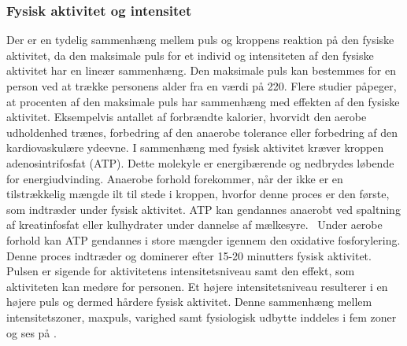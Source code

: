 \subsubsection{Fysisk aktivitet og intensitet}\label{subsub:ak_int}
Der er en tydelig sammenhæng mellem puls og kroppens reaktion på den fysiske aktivitet, da den maksimale puls for et individ og intensiteten af den fysiske aktivitet har en lineær sammenhæng. Den maksimale puls kan bestemmes for en person ved at trække personens alder fra en værdi på 220. \citep{CooperBlair2005}\newline
Flere studier påpeger, at procenten af den maksimale puls har sammenhæng med effekten af den fysiske aktivitet. Eksempelvis antallet af forbrændte kalorier, hvorvidt den aerobe udholdenhed trænes, forbedring af den anaerobe tolerance eller forbedring af den kardiovaskulære ydeevne. I sammenhæng med fysisk aktivitet kræver kroppen adenosintrifosfat (ATP). Dette molekyle er energibærende og nedbrydes løbende for energiudvinding. Anaerobe forhold forekommer, når der ikke er en tilstrækkelig mængde ilt til stede i kroppen, hvorfor denne proces er den første, som indtræder under fysisk aktivitet. ATP kan gendannes anaerobt ved spaltning af kreatinfosfat eller kulhydrater under dannelse af mælkesyre.~\citep{Martini2012,Academic2016c,Engelbreth2010} Under aerobe forhold kan ATP gendannes i store mængder igennem den oxidative fosforylering. Denne proces indtræder og dominerer efter 15-20 minutters fysisk aktivitet. 
\citep{Martini2012,Engelbreth2010} \newline
Pulsen er sigende for aktivitetens intensitetsniveau samt den effekt, som aktiviteten kan medøre for personen. Et højere intensitetsniveau resulterer i en højere puls og dermed hårdere fysisk aktivitet. Denne sammenhæng mellem intensitetszoner, maxpuls, varighed samt fysiologisk udbytte inddeles i fem zoner og ses på . \citep{Leyland2007,Heartratejournal2015}
